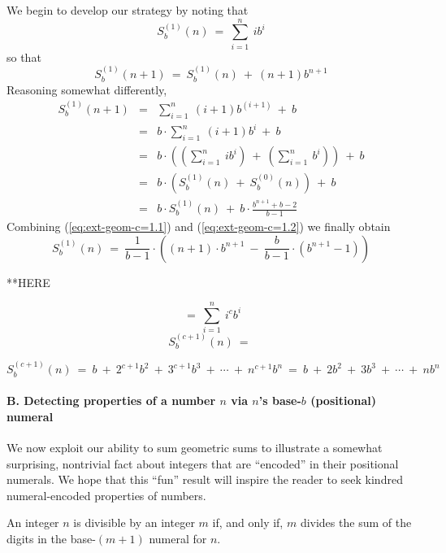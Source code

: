 We begin to develop our strategy by noting that
\[ S_b^{(1)}(n) \ = \ \sum_{i=1}^n \ i b^i  \]
so that
\begin{equation}
\label{eq:ext-geom-c=1.1}
S_b^{(1)}(n+1) \ = \ S_b^{(1)}(n) \ + \ (n+1) b^{n+1}
\end{equation}
Reasoning somewhat differently,
\begin{eqnarray*}
S_b^{(1)}(n+1)
     & = &
\sum_{i=1}^n \ (i+1) b^{(i+1)} \ + \ b \\
     & = &
b \cdot \sum_{i=1}^n \ (i+1) b^i \ + \ b \\
     & = &
b \cdot \left(
\left(\sum_{i=1}^n \ i b^i \right)
 \ + \
\left( \sum_{i=1}^n \  b^i \right)
\right) \ + \ b \\
     & = &
b \cdot \left( S_b^{(1)}(n) \ + \ S_b^{(0)}(n) \right) \ + \ b \\
\label{eq:ext-geom-c=1.2}
    & = &
b \cdot S_b^{(1)}(n) \ + \ b \cdot \frac{b^{n+1} + b - 2}{b-1}
\end{eqnarray*}
Combining (\ref{eq:ext-geom-c=1.1}) and (\ref{eq:ext-geom-c=1.2}) we
finally obtain
\[ S_b^{(1)}(n) \ = \
\frac{1}{b-1} \cdot \left(
(n+1) \cdot b^{n+1}
  \ - \
\frac{b}{b-1} \cdot (b^{n+1} - 1)
\right)
\]

**HERE

\[
 \ = \ \sum_{i=1}^n \ i^c b^i \]
\[
S_b^{(c+1)}(n) \ = \ 
\]

\[
S_b^{(c+1)}(n)
 \ = \
b \ + \ 2^{c+1} b^2\ + \ 3^{c+1} b^3 \ + \ \cdots \ + \ n^{c+1} b^n
 \ = \
b \ + \ 2 b^2\ + \ 3 b^3 \ + \ \cdots \ + \ n b^n
\]





\paragraph{B. Detecting properties of a number $n$ via $n$'s base-$b$ (positional) numeral}

We now exploit our ability to sum geometric sums to illustrate a
somewhat surprising, nontrivial fact about integers that are
``encoded'' in their positional numerals.  We hope that this ``fun''
result will inspire the reader to seek kindred numeral-encoded
properties of numbers.

\begin{prop}
\label{thm:div-by-b-bar}
An integer $n$ is divisible by an integer $m$ if, and only if, $m$
divides the sum of the digits in the base-$(m+1)$ numeral for $n$.
\end{prop}

